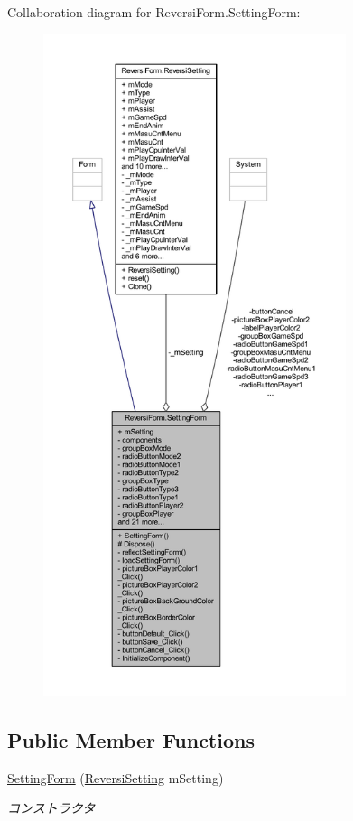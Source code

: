 Collaboration diagram for Reversi\+Form.\+Setting\+Form\+:\nopagebreak
\begin{figure}[H]
\begin{center}
\leavevmode
\includegraphics[height=550pt]{class_reversi_form_1_1_setting_form__coll__graph}
\end{center}
\end{figure}
\subsection*{Public Member Functions}
\begin{DoxyCompactItemize}
\item 
\hyperlink{class_reversi_form_1_1_setting_form_ac0583da0aa8221e0851b147271361ca8}{Setting\+Form} (\hyperlink{class_reversi_form_1_1_reversi_setting}{Reversi\+Setting} m\+Setting)
\begin{DoxyCompactList}\small\item\em コンストラクタ \end{DoxyCompactList}\end{DoxyCompactItemize}
